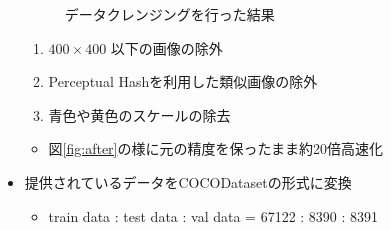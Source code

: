 \documentclass[a4j]{ujarticle}
\newcommand{\Fref}[1]{\mbox{図\ref{fig:#1}}}
\begin{document}
\begin{itemize}
\begin{figure}[ht]
				\caption{データクレンジングを行った結果}
			\end{figure}
            \begin{enumerate}
                \item $400 \times 400$ 以下の画像の除外
				\item Perceptual Hashを利用した類似画像の除外
				\item 青色や黄色のスケールの除去
            \end{enumerate}
            \begin{itemize}
                \item \Fref{after}の様に元の精度を保ったまま約20倍高速化
            \end{itemize}
            \item 提供されているデータをCOCODatasetの形式に変換
            \begin{itemize}
                \item train data : test data : val data = 67122 : 8390 : 8391
            \end{itemize}
		\end{itemize}

\clearpage
    
\end{document}

